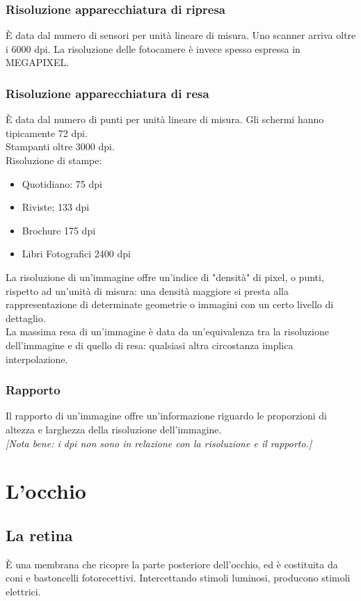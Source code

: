 \documentclass{report}
\begin{document}
	\subsection{Risoluzione apparecchiatura di ripresa}
	È data dal numero di sensori per unità lineare di misura.
	Uno scanner arriva oltre i 6000 dpi. La risoluzione delle fotocamere è invece spesso espressa in MEGAPIXEL.
	
	\subsection{Risoluzione apparecchiatura di resa}
	È data dal numero di punti per unità lineare di misura.
	Gli schermi hanno tipicamente 72 dpi.\\
	Stampanti oltre 3000 dpi.\\
	Risoluzione di stampe:
	\begin{itemize}
		\item Quotidiano: 75 dpi
		\item Riviste; 133 dpi
		\item Brochure 175 dpi
		\item Libri Fotografici 2400 dpi
	\end{itemize}
	La risoluzione di un'immagine offre un'indice di "densità" di pixel, o punti, rispetto ad un'unità di misura: una densità maggiore si presta alla rappresentazione di determinate geometrie o immagini con un certo livello di dettaglio.\\
	La massima resa di un'immagine è data da un'equivalenza tra la risoluzione dell'immagine e di quello di resa: qualsiasi altra circostanza implica interpolazione.
	\subsection{Rapporto}
	Il rapporto di un'immagine offre un'informazione riguardo le proporzioni di altezza e larghezza della risoluzione dell'immagine.\\
	\textit{[Nota bene: i dpi non sono in relazione con la risoluzione e il rapporto.]}
	\newpage
	\chapter{L'occhio}
	\section{La retina}
	È una membrana che ricopre la parte posteriore dell'occhio, ed è costituita da coni e bastoncelli fotorecettivi. Intercettando stimoli luminosi, producono stimoli elettrici.
	
\end{document}
